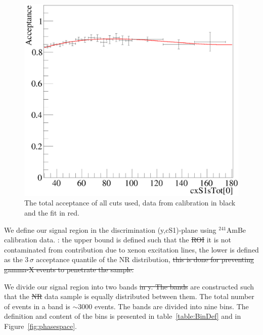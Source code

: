 \begin{figure}[t!]
\begin{minipage}{0.9\linewidth}
\centerline{\includegraphics[width=1.\linewidth]{Figures/Acceptance.eps}}
\end{minipage}
\caption{The total acceptance of all cuts used, data from calibration in black and the fit in red.}
\label{fig:Acc}
\end{figure}

We define our signal region in the discrimination (y,cS1)-plane using $^{241}$AmBe calibration data. 
: the upper bound is defined such that the \sout{ROI} 
it is not contaminated from contribution due to xenon excitation lines, the lower is defined as the 3\,$\sigma$ acceptance quantile of the NR distribution,
\sout{this is done for preventing gamma-X events to penetrate the sample.} 

We divide our signal region into two bands \sout{ in y. The bands}  are constructed such that the \sout{NR}  data sample is equally distributed 
 between them. The total number of events in a band is $\sim3000$ events. The bands are  divided into nine bins. The definition and content of the bins is presented in table~\ref{table:BinDef} and in Figure~\ref{fig:phasespace}. 


